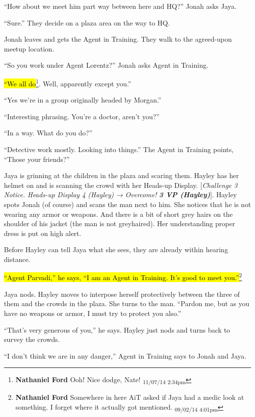 ``How about we meet him part way between here and HQ?'' Jonah asks Jaya.

``Sure.''  They decide on a plaza area on the way to HQ.



Jonah leaves and gets the Agent in Training.  They walk to the agreed-upon meetup location.

``So you work under Agent Lorentz?'' Jonah asks Agent in Training.

\hl{``We all do}\footnote{\textbf{Nathaniel Ford }Ooh! Nice dodge, Nate! \textsubscript{11/07/14 2:34pm}}.  Well, apparently except you.''

``Yes we're in a group originally headed by Morgan.''

``Interesting phrasing.  You're a doctor, aren't you?''

``In a way.  What do you do?''

``Detective work mostly.  Looking into things.''  The Agent in Training points, ``Those your friends?''



Jaya is grinning at the children in the plaza and scaring them.  Hayley has her helmet on and is scanning the crowd with her Heads-up Display.  {[}\textit{Challenge 3 Notice.  Heads-up Display 4 (Hayley) → Overcome! }\textit{\textbf{3 VP (Hayley)}}{]}.  Hayley spots Jonah (of course) and scans the man next to him.  She notices that he is not wearing any armor or weapons.  And there is a bit of short grey hairs on the shoulder of his jacket (the man is not greyhaired).  Her understanding proper dress is put on high alert.



Before Hayley can tell Jaya what she sees, they are already within hearing distance.  

\hl{``Agent Parvadi,'' he says, ``I am an Agent in Training.  It's good to meet you.''}\footnote{\textbf{Nathaniel Ford }Somewhere in here AiT asked if Jaya had a medic look at something. I forget where it actually got mentioned. \textsubscript{09/02/14 4:01pm}}

Jaya nods.  Hayley moves to interpose herself protectively between the three of them and the crowds in the plaza.  She turns to the man.  ``Pardon me, but as you have no weapons or armor, I must try to protect you also.''

``That's very generous of you,'' he says.  Hayley just nods and turns back to survey the crowds.

``I don't think we are in any danger,'' Agent in Training says to Jonah and Jaya.

